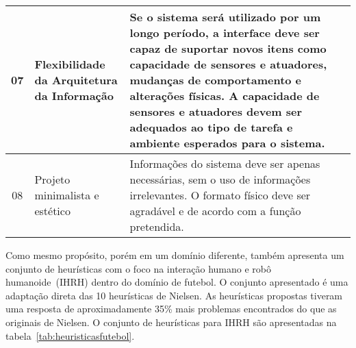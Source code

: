 \begin{table}[!ht]
\begin{tabular}{ c | m{4cm} | m{10cm} }
		\hline
        07 & Flexibilidade da Arquitetura da Informação & Se o sistema será utilizado por um longo período, a interface deve ser capaz de suportar novos itens como capacidade de sensores e atuadores, mudanças de comportamento e alterações físicas. A capacidade de sensores e atuadores devem ser adequados ao tipo de tarefa e ambiente esperados para o sistema. \\
		\hline
        08 & Projeto minimalista e estético & Informações do sistema deve ser apenas necessárias, sem o uso de informações irrelevantes. O formato físico deve ser agradável e de acordo com a função pretendida. \\
		\hline
	\end{tabular}
\end{table}

Como mesmo propósito, porém em um domínio diferente, \textcite{elara:2007} também apresenta um conjunto de heurísticas com o foco na interação humano e robô humanoide~(IHRH) dentro do domínio de futebol. O conjunto apresentado é uma adaptação direta das 10 heurísticas de Nielsen. As heurísticas propostas tiveram uma resposta de aproximadamente 35\% mais problemas encontrados do que as originais de Nielsen. O conjunto de heurísticas para IHRH são apresentadas na tabela~\ref{tab:heuristicasfutebol}.

